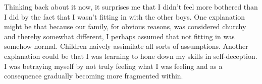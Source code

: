 Thinking back about it now, it surprises me that I didn't feel more
bothered than I did by the fact that I wasn't fitting in with the other
boys. One explanation might be that because our family, for obvious
reasons, was considered churchy and thereby somewhat different, I
perhaps assumed that not fitting in was somehow normal. Children naively
assimilate all sorts of assumptions. Another explanation could be that I
was learning to hone down my skills in self-deception. I was betraying
myself by not truly feeling what I was feeling and as a consequence
gradually becoming more fragmented within.

